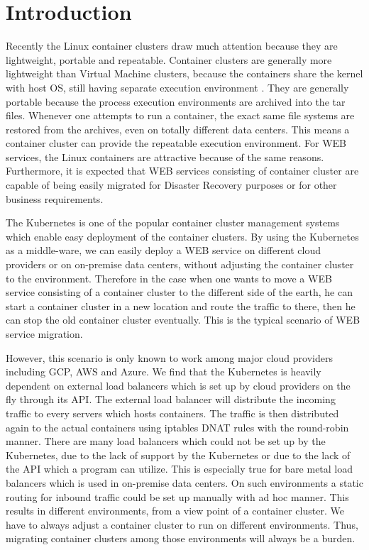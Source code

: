 \section{Introduction}

Recently the Linux container clusters draw much attention because they are lightweight, portable and repeatable.
Container clusters are generally more lightweight than Virtual Machine clusters, 
because the containers share the kernel with host OS, still having separate execution environment . 
They are generally portable because the process execution environments are archived into the tar files.
Whenever one attempts to run a container, the exact same file systems are restored from the archives, 
even on totally different data centers. 
This means a container cluster can provide the repeatable execution environment.
For WEB services, the Linux containers are attractive because of the same reasons. 
Furthermore, it is expected that WEB services consisting of container cluster are 
capable of being easily migrated for Disaster Recovery purposes or for other business requirements.

The Kubernetes\cite{K8s2017} is one of the popular container cluster management systems
which enable easy deployment of the container clusters.
By using the Kubernetes as a middle-ware, we can easily deploy a WEB service on different 
cloud providers or on on-premise data centers, without adjusting the container cluster to the environment.
Therefore in the case when one wants to move a WEB service consisting of a container cluster 
to the different side of the earth, he can start a container cluster in a new location and 
route the traffic to there, then he can stop the old container cluster eventually.
This is the typical scenario of WEB service migration.

However, this scenario is only known to work among major cloud providers including GCP, AWS and Azure.
We find that the Kubernetes is heavily dependent on external load balancers 
which is set up by cloud providers on the fly through its API. 
The external load balancer will distribute the incoming traffic to every servers which hosts containers.
The traffic is then distributed again to the actual containers using iptables DNAT\cite{MartinA.Brown2017,Marmol2015} 
rules with the round-robin manner. 
There are many load balancers which could not be set up by the Kubernetes, 
due to the lack of support by the Kubernetes or due to the lack of the API which a program can utilize.
This is especially true for bare metal load balancers which is used in on-premise data centers.
On such environments a static routing for inbound traffic could be set up manually with ad hoc manner.
This results in different environments, from a view point of a container cluster.
We have to always adjust a container cluster to run on different environments.
Thus, migrating container clusters among those environments will always be a burden.

